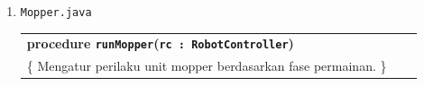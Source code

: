 \documentclass{article}
\newenvironment{pseudobox}
{
\centering
\begin{longtable}{|p{0.94\linewidth}|}
\hline
}
{
\\ \hline
\end{longtable}
\vspace{0.05cm}
}
\begin{document}
\begin{enumerate}[label=\alph*.]
\begin{pseudobox}
\hspace*{1.5em}if \texttt{dir} $\neq$ null and \texttt{rc.canMove(dir)} then \\
\hspace*{3em}\texttt{rc.move(dir)} \\
\hspace*{1.5em}endif \\

\hspace*{1.5em}if \texttt{dir} $\neq$ null then \\
\hspace*{3em}\texttt{ahead} $\leftarrow$ \texttt{rc.getLocation().add(dir)} \\
\hspace*{1.5em}else \\
\hspace*{3em}\texttt{ahead} $\leftarrow$ \texttt{rc.getLocation()} \\
\hspace*{1.5em}endif \\

\hspace*{1.5em}\texttt{dirInfo} $\leftarrow$ \texttt{rc.senseMapInfo(ahead)} \\

\hspace*{1.5em}if \texttt{dirInfo.getPaint()} = \texttt{ENEMY\_PRIMARY} \\
\hspace*{3em}or \texttt{dirInfo.getPaint()} = \texttt{ENEMY\_SECONDARY} \\
\hspace*{3em}or \texttt{dirInfo.getPaint()} = \texttt{EMPTY} then \\

\hspace*{3em}if \texttt{rc.canAttack(rc.getLocation())} then \\
\hspace*{4.5em}\texttt{rc.attack(rc.getLocation())} \\
\hspace*{3em}endif \\

\hspace*{1.5em}endif \\
\end{pseudobox}

\item \texttt{Mopper.java}

\begin{pseudobox}
\textbf{procedure \texttt{runMopper}(\texttt{rc : RobotController})} \\
\{ Mengatur perilaku unit mopper berdasarkan fase permainan. \}


\end{pseudobox}
\end{enumerate}
\end{document}
